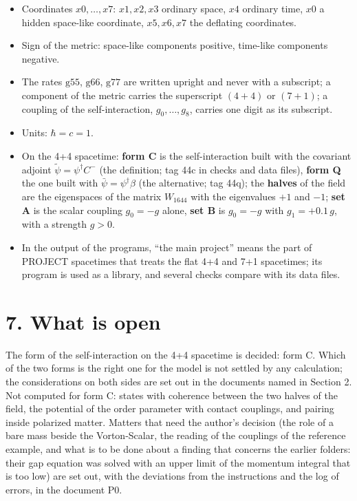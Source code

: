 \documentclass[
  10pt,
]{article}
\providecommand{\tightlist}{%
  \setlength{\itemsep}{0pt}\setlength{\parskip}{0pt}}
\begin{document}
\begin{itemize}
\tightlist
\item
  Coordinates \(x0,\dots,x7\): \(x1,x2,x3\) ordinary space, \(x4\)
  ordinary time, \(x0\) a hidden space-like coordinate, \(x5,x6,x7\) the
  deflating coordinates.
\item
  Sign of the metric: space-like components positive, time-like
  components negative.
\item
  The rates \(\mathrm{g55}\), \(\mathrm{g66}\), \(\mathrm{g77}\) are
  written upright and never with a subscript; a component of the metric
  carries the superscript \((4+4)\) or \((7+1)\); a coupling of the
  self-interaction, \(g_0,\dots,g_8\), carries one digit as its
  subscript.
\item
  Units: \(\hbar=c=1\).
\item
  On the 4+4 spacetime: \textbf{form C} is the self-interaction built
  with the covariant adjoint \(\tilde\psi=\psi^\dagger C^-\) (the
  definition; tag 44c in checks and data files), \textbf{form Q} the one
  built with \(\bar\psi=\psi^\dagger\beta\) (the alternative; tag 44q);
  the \textbf{halves} of the field are the eigenspaces of the matrix
  \(W_{1644}\) with the eigenvalues \(+1\) and \(-1\); \textbf{set A} is
  the scalar coupling \(g_0=-g\) alone, \textbf{set B} is \(g_0=-g\)
  with \(g_1=+0.1\,g\), with a strength \(g>0\).
\item
  In the output of the programs, ``the main project'' means the part of
  PROJECT spacetimes that treats the flat 4+4 and 7+1 spacetimes; its
  program is used as a library, and several checks compare with its data
  files.
\end{itemize}

\hypertarget{what-is-open}{%
\section{7. What is open}\label{what-is-open}}

The form of the self-interaction on the 4+4 spacetime is decided: form
C. Which of the two forms is the right one for the model is not settled
by any calculation; the considerations on both sides are set out in the
documents named in Section 2. Not computed for form C: states with
coherence between the two halves of the field, the potential of the
order parameter with contact couplings, and pairing inside polarized
matter. Matters that need the author's decision (the role of a bare mass
beside the Vorton-Scalar, the reading of the couplings of the reference
example, and what is to be done about a finding that concerns the
earlier folders: their gap equation was solved with an upper limit of
the momentum integral that is too low) are set out, with the deviations
from the instructions and the log of errors, in the document P0.
\end{document}
